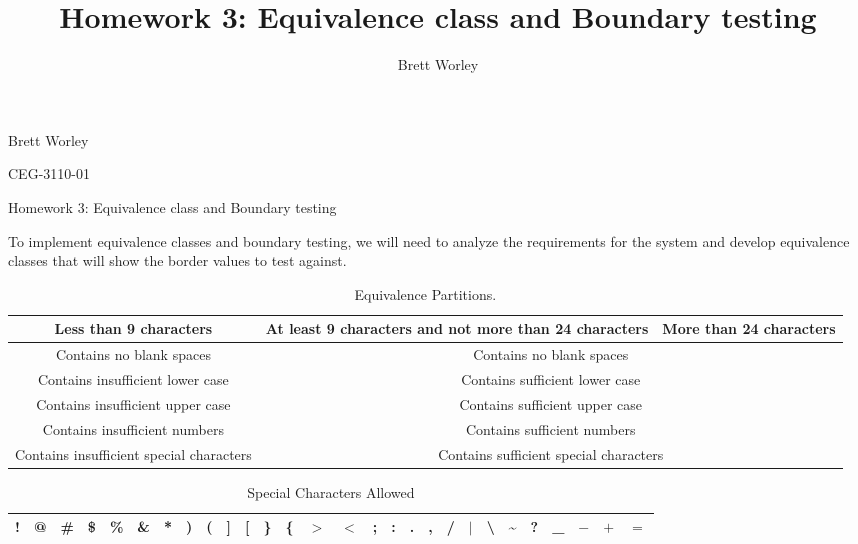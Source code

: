 \documentclass[12pt,letterpaper]{article}
\author{Brett Worley}
\title{Homework 3: Equivalence class and Boundary testing}
\begin{document}
Brett Worley

CEG-3110-01

\centerline{Homework 3: Equivalence class and Boundary testing}

To implement equivalence classes and boundary testing, we will need to analyze the requirements
for the system and develop equivalence classes that will show the border values to test against.

\begin{table}[h!]
  \begin{center}
    \caption{Equivalence Partitions.}
    \label{tab:table1}
    
    
    \begin{tabular}{||c|m{4cm}|m{3cm}||}
    \hline
    Less than 9 characters & At least 9 characters and not more than 24
    characters & More than 24 characters \\
    
    \hline \hline
    \multicolumn{1}{||c|}{Contains no blank spaces} & \multicolumn{2}{c||}{Contains no blank spaces} \\
    
    \hline \hline
    \multicolumn{1}{||c|}{Contains insufficient lower case} 
    & \multicolumn{2}{c||}{Contains sufficient lower case} \\
    
    \hline \hline
    \multicolumn{1}{||c|}{Contains insufficient upper case} 
    & \multicolumn{2}{c||}{Contains sufficient upper case} \\
    
    \hline \hline
    \multicolumn{1}{||c|}{Contains insufficient numbers} 
    & \multicolumn{2}{c||}{Contains sufficient numbers} \\
    
    \hline \hline
    \multicolumn{1}{||c|}{Contains insufficient special characters} 
    & \multicolumn{2}{c||}{Contains sufficient special characters} \\
    \hline
    \end{tabular}
  \end{center}
\end{table}


\begin{table}[h!]
  \begin{center}
    \caption{Special Characters Allowed}
    \label{tab:specials}
    \begin{tabular}{|c|c|c|c|c|c|c|c|c|c|c|c|c|c|c|c|c|c|c|c|c|c|c|c|c|c|c|c|}
    \hline
    ! & @ & \# & \$ & \% & \& & * &  ) & ( & ] & [ & \} & \{ & $>$ & $<$ & ; 
    & : & . & , & / & $|$ &  \textbackslash & \~{} & ? & \_ & $-$ & $+$ & $=$ \\
    \hline
    \end{tabular}
  \end{center}
\end{table}
\end{document}
